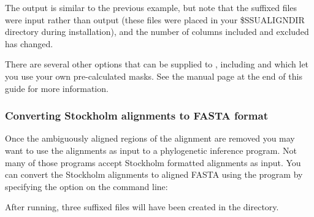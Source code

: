 The output is similar to the previous example, but note that the
 suffixed files were input rather than output (these files
were placed in your \$SSUALIGNDIR directory during installation), and the number
of columns included and excluded has changed.

There are several other options that can be supplied to
, including  and  which let you 
use your own pre-calculated masks. See the 
manual page at the end of this guide for more information. 

\subsubsection{Converting Stockholm alignments to FASTA format}
Once the ambiguously aligned regions of the alignment are removed you may
want to use the alignments as input to a phylogenetic inference
program. Not many of those programs accept Stockholm formatted
alignments as input. You can convert the Stockholm alignments to aligned FASTA
using the  program by specifying the 
option on the command line:


After running, three  suffixed files will have been created
in the  directory.




